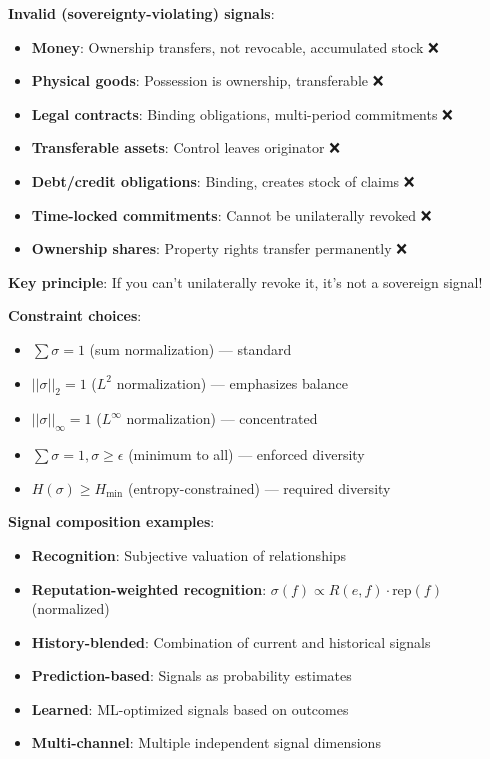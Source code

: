 \documentclass[11pt,a4paper]{article}
\theoremstyle{definition}
\theoremstyle{remark}
\begin{document}
\textbf{Invalid (sovereignty-violating) signals}:
\begin{itemize}
\item \textbf{Money}: Ownership transfers, not revocable, accumulated stock ❌
\item \textbf{Physical goods}: Possession is ownership, transferable ❌
\item \textbf{Legal contracts}: Binding obligations, multi-period commitments ❌
\item \textbf{Transferable assets}: Control leaves originator ❌
\item \textbf{Debt/credit obligations}: Binding, creates stock of claims ❌
\item \textbf{Time-locked commitments}: Cannot be unilaterally revoked ❌
\item \textbf{Ownership shares}: Property rights transfer permanently ❌
\end{itemize}

\textbf{Key principle}: If you can't unilaterally revoke it, it's not a sovereign signal!

\textbf{Constraint choices}:
\begin{itemize}
\item $\sum \sigma = 1$ (sum normalization) --- standard
\item $||\sigma||_2 = 1$ ($L^2$ normalization) --- emphasizes balance
\item $||\sigma||_\infty = 1$ ($L^\infty$ normalization) --- concentrated
\item $\sum \sigma = 1, \sigma \ge \epsilon$ (minimum to all) --- enforced diversity
\item $H(\sigma) \ge H_{\min}$ (entropy-constrained) --- required diversity
\end{itemize}

\textbf{Signal composition examples}:
\begin{itemize}
\item \textbf{Recognition}: Subjective valuation of relationships
\item \textbf{Reputation-weighted recognition}: $\sigma(f) \propto R(e,f) \cdot \text{rep}(f)$ (normalized)
\item \textbf{History-blended}: Combination of current and historical signals
\item \textbf{Prediction-based}: Signals as probability estimates
\item \textbf{Learned}: ML-optimized signals based on outcomes
\item \textbf{Multi-channel}: Multiple independent signal dimensions
\end{itemize}
\end{document}
